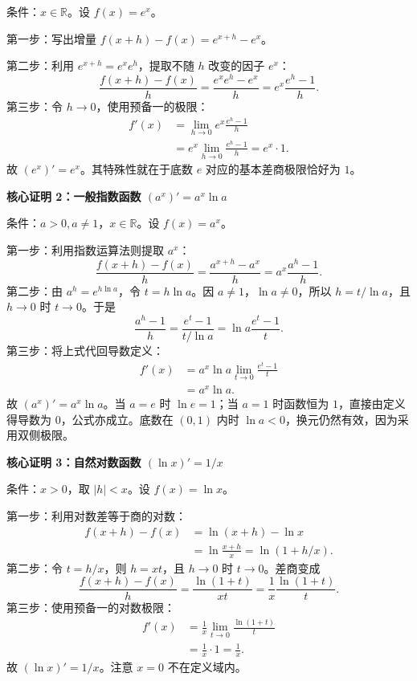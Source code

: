 \begin{proofbox}
\begin{minipage}{\linewidth}
\end{minipage}

条件：$x\in\mathbb R$。设 $f(x)=e^x$。

第一步：写出增量 $f(x+h)-f(x)=e^{x+h}-e^x$。

第二步：利用 $e^{x+h}=e^xe^h$，提取不随 $h$ 改变的因子 $e^x$：
\[
\frac{f(x+h)-f(x)}h=\frac{e^xe^h-e^x}{h}=e^x\frac{e^h-1}{h}.
\]
第三步：令 $h\to0$，使用预备一的极限：
\[
\begin{aligned}
f'(x)&=\lim_{h\to0}e^x\frac{e^h-1}{h}\\
&=e^x\lim_{h\to0}\frac{e^h-1}{h}=e^x\cdot1.
\end{aligned}
\]
故 $\boxed{(e^x)'=e^x}$。其特殊性就在于底数 $e$ 对应的基本差商极限恰好为 $1$。

\medskip
\begin{minipage}{\linewidth}
\textbf{\textcolor{CProof}{核心证明 2：一般指数函数 $(a^x)'=a^x\ln a$}}


\end{minipage}

条件：$a>0,a\ne1$，$x\in\mathbb R$。设 $f(x)=a^x$。

第一步：利用指数运算法则提取 $a^x$：
\[
\frac{f(x+h)-f(x)}h=\frac{a^{x+h}-a^x}{h}=a^x\frac{a^h-1}{h}.
\]
第二步：由 $a^h=e^{h\ln a}$，令 $t=h\ln a$。因 $a\ne1$，$\ln a\ne0$，所以 $h=t/\ln a$，且 $h\to0$ 时 $t\to0$。于是
\[
\frac{a^h-1}{h}=\frac{e^t-1}{t/\ln a}=\ln a\frac{e^t-1}{t}.
\]
第三步：将上式代回导数定义：
\[
\begin{aligned}
f'(x)&=a^x\ln a\lim_{t\to0}\frac{e^t-1}{t}\\
&=a^x\ln a.
\end{aligned}
\]
故 $\boxed{(a^x)'=a^x\ln a}$。当 $a=e$ 时 $\ln e=1$；当 $a=1$ 时函数恒为 $1$，直接由定义得导数为 $0$，公式亦成立。底数在 $(0,1)$ 内时 $\ln a<0$，换元仍然有效，因为采用双侧极限。

\medskip
\begin{minipage}{\linewidth}
\textbf{\textcolor{CProof}{核心证明 3：自然对数函数 $(\ln x)'=1/x$}}


\end{minipage}

条件：$x>0$，取 $|h|<x$。设 $f(x)=\ln x$。

第一步：利用对数差等于商的对数：
\[
\begin{aligned}
f(x+h)-f(x)&=\ln(x+h)-\ln x\\
&=\ln\frac{x+h}{x}=\ln(1+h/x).
\end{aligned}
\]
第二步：令 $t=h/x$，则 $h=xt$，且 $h\to0$ 时 $t\to0$。差商变成
\[
\frac{f(x+h)-f(x)}h=\frac{\ln(1+t)}{xt}=\frac1x\frac{\ln(1+t)}t.
\]
第三步：使用预备一的对数极限：
\[
\begin{aligned}
f'(x)&=\frac1x\lim_{t\to0}\frac{\ln(1+t)}t\\
&=\frac1x\cdot1=\frac1x.
\end{aligned}
\]
故 $\boxed{(\ln x)'=1/x}$。注意 $x=0$ 不在定义域内。


\end{proofbox}
